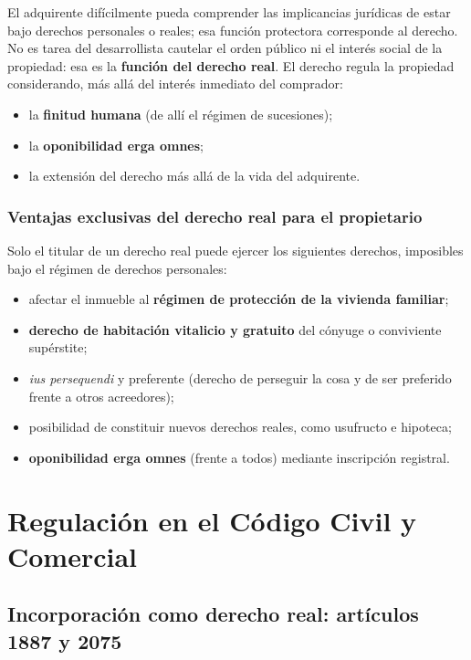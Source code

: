 \documentclass[12pt,oneside]{book}
\begin{document}
El adquirente difícilmente pueda comprender las implicancias jurídicas de estar bajo derechos personales o reales; esa función protectora corresponde al derecho. No es tarea del desarrollista cautelar el orden público ni el interés social de la propiedad: esa es la \textbf{función del derecho real}. El derecho regula la propiedad considerando, más allá del interés inmediato del comprador:

\begin{itemize}
    \item la \textbf{finitud humana} (de allí el régimen de sucesiones);
    \item la \textbf{oponibilidad erga omnes};
    \item la extensión del derecho más allá de la vida del adquirente.
\end{itemize}

\subsection{Ventajas exclusivas del derecho real para el propietario}

Solo el titular de un derecho real puede ejercer los siguientes derechos, imposibles bajo el régimen de derechos personales:

\begin{itemize}
    \item afectar el inmueble al \textbf{régimen de protección de la vivienda familiar};
    \item \textbf{derecho de habitación vitalicio y gratuito} del cónyuge o conviviente supérstite;
    \item \textit{ius persequendi} y preferente (derecho de perseguir la cosa y de ser preferido frente a otros acreedores);
    \item posibilidad de constituir nuevos derechos reales, como usufructo e hipoteca;
    \item \textbf{oponibilidad erga omnes} (frente a todos) mediante inscripción registral.
\end{itemize}

\chapter[Regulación en el CCyC]{Regulación en el Código Civil y Comercial}

\section{Incorporación como derecho real: artículos 1887 y 2075}
\end{document}
